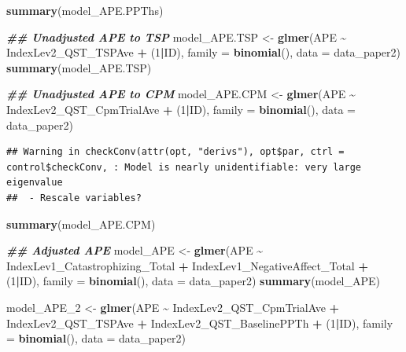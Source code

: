\documentclass[
  12pt,
]{article}
\newenvironment{Shaded}{\begin{snugshade}}{\end{snugshade}}
\newcommand{\AttributeTok}[1]{\textcolor[rgb]{0.13,0.29,0.53}{#1}}
\newcommand{\DecValTok}[1]{\textcolor[rgb]{0.00,0.00,0.81}{#1}}
\newcommand{\DocumentationTok}[1]{\textcolor[rgb]{0.56,0.35,0.01}{\textbf{\textit{#1}}}}
\newcommand{\FunctionTok}[1]{\textcolor[rgb]{0.13,0.29,0.53}{\textbf{#1}}}
\newcommand{\NormalTok}[1]{#1}
\newcommand{\OtherTok}[1]{\textcolor[rgb]{0.56,0.35,0.01}{#1}}
\newcommand{\SpecialCharTok}[1]{\textcolor[rgb]{0.81,0.36,0.00}{\textbf{#1}}}
\begin{document}
\begin{Shaded}
\begin{Highlighting}[]
\FunctionTok{summary}\NormalTok{(model\_APE.PPThs)}

\DocumentationTok{\#\# Unadjusted APE to TSP}
\NormalTok{model\_APE.TSP }\OtherTok{\textless{}{-}} \FunctionTok{glmer}\NormalTok{(APE }\SpecialCharTok{\textasciitilde{}}\NormalTok{ IndexLev2\_QST\_TSPAve }\SpecialCharTok{+}\NormalTok{ (}\DecValTok{1}\SpecialCharTok{|}\NormalTok{ID), }\AttributeTok{family =} \FunctionTok{binomial}\NormalTok{(), }\AttributeTok{data =}\NormalTok{ data\_paper2)}
\FunctionTok{summary}\NormalTok{(model\_APE.TSP)}

\DocumentationTok{\#\# Unadjusted APE to CPM}
\NormalTok{model\_APE.CPM }\OtherTok{\textless{}{-}} \FunctionTok{glmer}\NormalTok{(APE }\SpecialCharTok{\textasciitilde{}}\NormalTok{ IndexLev2\_QST\_CpmTrialAve }\SpecialCharTok{+}\NormalTok{ (}\DecValTok{1}\SpecialCharTok{|}\NormalTok{ID), }\AttributeTok{family =} \FunctionTok{binomial}\NormalTok{(), }\AttributeTok{data =}\NormalTok{ data\_paper2)}
\end{Highlighting}
\end{Shaded}

\begin{verbatim}
## Warning in checkConv(attr(opt, "derivs"), opt$par, ctrl = control$checkConv, : Model is nearly unidentifiable: very large eigenvalue
##  - Rescale variables?
\end{verbatim}

\begin{Shaded}
\begin{Highlighting}[]
\FunctionTok{summary}\NormalTok{(model\_APE.CPM)}
\end{Highlighting}
\end{Shaded}

\begin{Shaded}
\begin{Highlighting}[]
\DocumentationTok{\#\# Adjusted APE}
\NormalTok{model\_APE }\OtherTok{\textless{}{-}} \FunctionTok{glmer}\NormalTok{(APE }\SpecialCharTok{\textasciitilde{}}\NormalTok{ IndexLev1\_Catastrophizing\_Total }\SpecialCharTok{+}\NormalTok{ IndexLev1\_NegativeAffect\_Total }\SpecialCharTok{+}\NormalTok{ (}\DecValTok{1}\SpecialCharTok{|}\NormalTok{ID), }\AttributeTok{family =} \FunctionTok{binomial}\NormalTok{(), }\AttributeTok{data =}\NormalTok{ data\_paper2)}
\FunctionTok{summary}\NormalTok{(model\_APE)}

\NormalTok{model\_APE\_2 }\OtherTok{\textless{}{-}} \FunctionTok{glmer}\NormalTok{(APE }\SpecialCharTok{\textasciitilde{}}\NormalTok{ IndexLev2\_QST\_CpmTrialAve }\SpecialCharTok{+}\NormalTok{ IndexLev2\_QST\_TSPAve }\SpecialCharTok{+}\NormalTok{ IndexLev2\_QST\_BaselinePPTh }\SpecialCharTok{+}\NormalTok{ (}\DecValTok{1}\SpecialCharTok{|}\NormalTok{ID), }\AttributeTok{family =} \FunctionTok{binomial}\NormalTok{(), }\AttributeTok{data =}\NormalTok{ data\_paper2)}
\end{Highlighting}
\end{Shaded}
\end{document}
